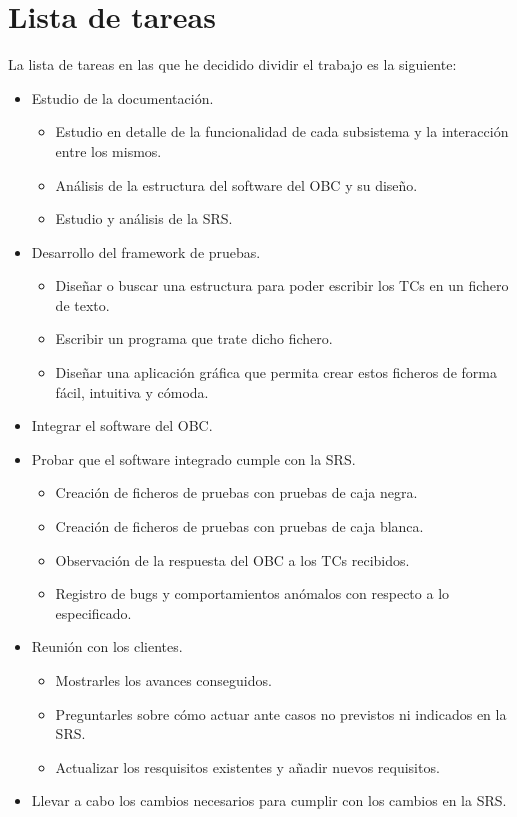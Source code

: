 
\section{Lista de tareas}
La lista de tareas en las que he decidido dividir el trabajo es la siguiente:
\begin{itemize}
\item Estudio de la documentación.
  \begin{itemize}
  \item Estudio en detalle de la funcionalidad de cada subsistema y la
    interacción entre los mismos.
  \item Análisis de la estructura del software del OBC y su diseño.
  \item Estudio y análisis de la SRS.
  \end{itemize}

\item Desarrollo del framework de pruebas.
  \begin{itemize}
  \item Diseñar o buscar una estructura para poder escribir los TCs en un
    fichero de texto.
  \item Escribir un programa que trate dicho fichero.
  \item Diseñar una aplicación gráfica que permita crear estos ficheros de
    forma fácil, intuitiva y cómoda.
  \end{itemize}

\item Integrar el software del OBC.

\item Probar que el software integrado cumple con la SRS.
  \begin{itemize}
  \item Creación de ficheros de pruebas con pruebas de caja negra.
  \item Creación de ficheros de pruebas con pruebas de caja blanca.
  \item Observación de la respuesta del OBC a los TCs recibidos.
  \item Registro de bugs y comportamientos anómalos con respecto a lo
    especificado.
  \end{itemize}

\item Reunión con los clientes.
  \begin{itemize}
  \item Mostrarles los avances conseguidos.
  \item Preguntarles sobre cómo actuar ante casos no previstos ni indicados
    en la SRS.
  \item Actualizar los resquisitos existentes y añadir nuevos requisitos.
  \end{itemize}

\item Llevar a cabo los cambios necesarios para cumplir con los cambios en la
  SRS.
  
\end{itemize}

